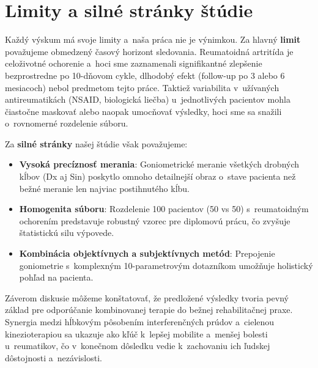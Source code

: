 \section{Limity a silné stránky štúdie}

Každý výskum má svoje limity a~naša práca nie je výnimkou. Za hlavný \textbf{limit} považujeme obmedzený časový horizont sledovania. Reumatoidná artritída je celoživotné ochorenie a~hoci sme zaznamenali signifikantné zlepšenie bezprostredne po 10-dňovom cykle, dlhodobý efekt (follow-up po 3 alebo 6 mesiacoch) nebol predmetom tejto práce. Taktiež variabilita v~užívaných antireumatikách (NSAID, biologická liečba) u~jednotlivých pacientov mohla čiastočne maskovať alebo naopak umocňovať výsledky, hoci sme sa snažili o~rovnomerné rozdelenie súboru.

Za \textbf{silné stránky} našej štúdie však považujeme:
\begin{itemize}
    \item \textbf{Vysoká precíznosť merania}: Goniometrické meranie všetkých drobných kĺbov (Dx aj Sin) poskytlo omnoho detailnejší obraz o~stave pacienta než bežné meranie len najviac postihnutého kĺbu.
    \item \textbf{Homogenita súboru}: Rozdelenie 100 pacientov (50 vs 50) s~reumatoidným ochorením predstavuje robustný vzorec pre diplomovú prácu, čo zvyšuje štatistickú silu výpovede.
    \item \textbf{Kombinácia objektívnych a subjektívnych metód}: Prepojenie goniometrie s~komplexným 10-parametrovým dotazníkom umožňuje holistický pohľad na pacienta.
\end{itemize}

Záverom diskusie môžeme konštatovať, že predložené výsledky tvoria pevný základ pre odporúčanie kombinovanej terapie do bežnej rehabilitačnej praxe. Synergia medzi hĺbkovým pôsobením interferenčných prúdov a~cielenou kinezioterapiou sa ukazuje ako kľúč k~lepšej mobilite a~menšej bolesti u~reumatikov, čo v~konečnom dôsledku vedie k~zachovaniu ich ľudskej dôstojnosti a~nezávislosti.

\clearpage
